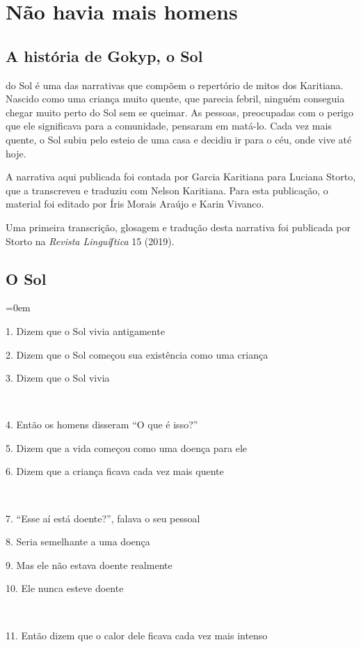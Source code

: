 \part{Não havia mais homens}

\chapter{A história de Gokyp, o Sol}

 do Sol é uma das narrativas que compõem o repertório de mitos
dos Karitiana. Nascido como uma criança muito quente, que parecia
febril, ninguém conseguia chegar muito perto do Sol sem se queimar. As
pessoas, preocupadas com o perigo que ele significava para a comunidade,
pensaram em matá-lo. Cada vez mais quente, o Sol subiu pelo esteio de
uma casa e decidiu ir para o céu, onde vive até hoje.

A narrativa aqui publicada foi contada por Garcia Karitiana para Luciana
Storto, que a transcreveu e traduziu com Nelson Karitiana. Para esta
publicação, o material foi editado por Íris Morais Araújo e Karin
Vivanco.

Uma primeira transcrição, glosagem e tradução desta narrativa foi
publicada por Storto na \emph{Revista Linguíʃtica} 15 (2019).

\chapter*{O Sol}\parindent=0em

1. Dizem que o Sol vivia antigamente

2. Dizem que o Sol começou sua existência como uma criança

3. Dizem que o Sol vivia

~

4. Então os homens disseram ``O que é isso?''

5. Dizem que a vida começou como uma doença para ele

6. Dizem que a criança ficava cada vez mais quente

~

7. ``Esse aí está doente?'', falava o seu pessoal

8. Seria semelhante a uma doença

9. Mas ele não estava doente realmente

10. Ele nunca esteve doente

~

11. Então dizem que o calor dele ficava cada vez mais intenso

